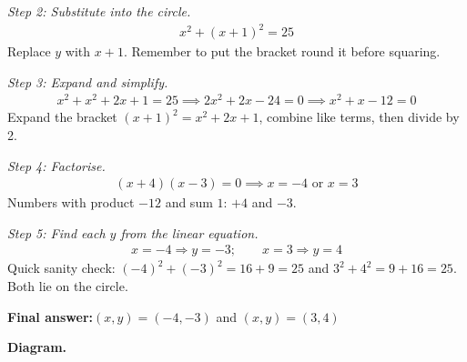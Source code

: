 \documentclass[11pt]{article}
\begin{document}
\textit{Step 2: Substitute into the circle.}
\[\begin{gathered}
x^2 + (x + 1)^2 = 25
\end{gathered}\]
Replace \( y \) with \( x + 1 \). Remember to put the bracket round it before squaring.

\textit{Step 3: Expand and simplify.}
\[\begin{gathered}
x^2 + x^2 + 2x + 1 = 25 \implies 2x^2 + 2x - 24 = 0 \implies x^2 + x - 12 = 0
\end{gathered}\]
Expand the bracket \( (x+1)^2 = x^2 + 2x + 1 \), combine like terms, then divide by 2.

\textit{Step 4: Factorise.}
\[\begin{gathered}
(x + 4)(x - 3) = 0 \implies x = -4 \text{ or } x = 3
\end{gathered}\]
Numbers with product \( -12 \) and sum \( 1 \): \( +4 \) and \( -3 \).

\textit{Step 5: Find each \( y \) from the linear equation.}
\[\begin{gathered}
x = -4 \Rightarrow y = -3; \qquad x = 3 \Rightarrow y = 4
\end{gathered}\]
Quick sanity check: \( (-4)^2 + (-3)^2 = 16 + 9 = 25 \) and \( 3^2 + 4^2 = 9 + 16 = 25 \). Both lie on the circle.

\begin{answerbox}
\textbf{Final answer:}\quad \(\displaystyle (x, y) = (-4, -3)\) and \(\displaystyle (x, y) = (3, 4)\)
\end{answerbox}
\textbf{Diagram.}
\end{document}
